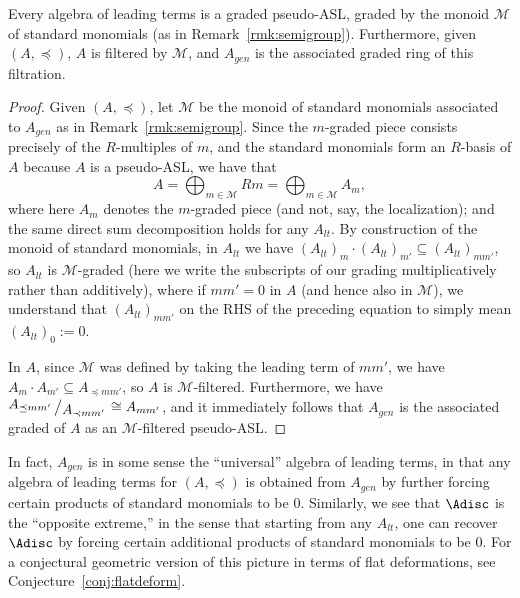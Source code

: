 \documentclass[11pt,reqno]{amsart}
\newcommand{\bigslant}[2]{{\raisebox{.2em}{$#1$}\left/\raisebox{-.2em}{$#2$}\right.}}
\theoremstyle{definition}
\numberwithin{equation}{section}
\begin{document}
\begin{proposition}
Every algebra of leading terms is a graded pseudo-ASL, graded by the monoid $\mathcal{M}$ of standard monomials (as in Remark~\ref{rmk:semigroup}). Furthermore, given $(A,\preceq)$, $A$ is filtered by $\mathcal{M}$, and $A_{gen}$ is the associated graded ring of this filtration.
\end{proposition}

\begin{proof}
Given $(A, \preceq)$, let $\mathcal{M}$ be the monoid of standard monomials associated to $A_{gen}$ as in Remark~\ref{rmk:semigroup}. Since the $m$-graded piece consists precisely of the $R$-multiples of $m$, and the standard monomials form an $R$-basis of $A$ because $A$ is a pseudo-ASL, we have that 
\[
A = \bigoplus_{m \in \mathcal{M}} Rm = \bigoplus_{m \in \mathcal{M}} A_m,
\]
where here $A_m$ denotes the $m$-graded piece (and not, say, the localization); and the same direct sum decomposition holds for any $A_{lt}$. By construction of the monoid of standard monomials, in $A_{lt}$ we have $(A_{lt})_m \cdot (A_{lt})_{m'} \subseteq (A_{lt})_{mm'}$, so $A_{lt}$ is $\mathcal{M}$-graded (here we write the subscripts of our grading multiplicatively rather than additively), where if $mm' = 0$ in $A$ (and hence also in $\mathcal{M}$), we understand that $(A_{lt})_{mm'}$ on the RHS of the preceding equation to simply mean $(A_{lt})_0 := 0$.

In $A$, since $\mathcal{M}$ was defined by taking the leading term of $mm'$, we have $A_m \cdot A_{m'} \subseteq A_{\preceq mm'}$, so $A$ is $\mathcal{M}$-filtered. Furthermore, we have $\bigslant{A_{\preceq mm'}}{A_{\prec mm'}} \cong A_{mm'}$, and it immediately follows that $A_{gen}$ is the associated graded of $A$ as an $\mathcal{M}$-filtered pseudo-ASL.
\end{proof}


\begin{remark}
In fact, $A_{gen}$ is in some sense the ``universal'' algebra of leading terms, in that any algebra of leading terms for $(A, \preceq)$ is obtained from $A_{gen}$ by further forcing certain products of standard monomials to be 0. Similarly, we see that $\Adisc$ is the ``opposite extreme,'' in the sense that starting from any $A_{lt}$, one can recover $\Adisc$ by forcing certain additional products of standard monomials to be 0. For a conjectural geometric version of this picture in terms of flat deformations, see Conjecture~\ref{conj:flatdeform}.
\end{remark}
\end{document}

